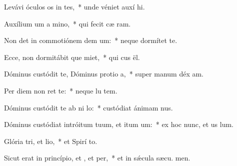 \item Levávi óculos os in tes,~* unde véniet auxí hi.
\item Auxílium um a mino,~* qui fecit cæ  ram.
\item Non det in commotiónem dem um:~* neque dormítet   te.
\item Ecce, non dormitábit que miet,~* qui cus ël.
\item Dóminus custódit te, Dóminus protio a,~* super manum déx am.
\item Per diem  non ret te:~* neque lu  tem.
\item Dóminus custódit te ab ni lo:~* custódiat ánimam  nus.
\item Dóminus custódiat intróitum tuum, et itum um:~* ex hoc nunc, et us  lum.
\item Glória tri, et lio,~* et Spirí to.
\item Sicut erat in princípio, et , et per,~* et in sǽcula sæcu. men.
